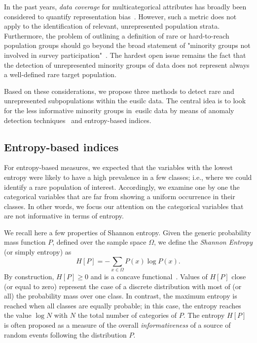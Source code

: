 In the past years, \emph{data coverage} for multicategorical attributes has broadly been considered to quantify representation bias~\cite[]{asudeh2019assessing, asudeh2021identifying, jin2020mithracoverage}.
However, such a metric does not apply to the identification of relevant, unrepresented population strata.
Furthermore, the problem of outlining a definition of rare or hard-to-reach population groups should go beyond the broad statement of "minority groups not involved in survey participation"~\cite[]{brackertz2007hard}. 
The hardest open issue remains the fact that the detection of unrepresented minority groups of data does not represent always a well-defined rare target population. 

Based on these considerations, we propose three methods to detect rare and unrepresented subpopulations within the \gls{eusilc} data.
The central idea is to look for the less informative minority groups in~\gls{eusilc} data by means of anomaly detection techniques~\cite[]{chandola2009anomaly} and entropy-based indices.

\subsection{Entropy-based indices}\label{sec: Entropy-Based indices}

For entropy-based measures, we expected that 
the variables with the lowest entropy were likely to have a high prevalence in a few classes; i.e., where we could identify a rare population of interest.
Accordingly, we examine one by one the categorical variables that are far from showing a uniform occurrence in their classes.
In other words, we focus our attention on the categorical variables that are not informative in terms of entropy. 

We recall here a few properties of Shannon entropy.
Given the generic probability mass function $P$, defined over the sample space $\Omega$, we define the \emph{Shannon Entropy} (or simply entropy) as 
\begin{equation}\label{eq: Entropy_discrete}
    H[P] = -\sum_{x\in \Omega} P(x) \log{P(x)}.
\end{equation}
By construction, $H[P] \ge 0$ and is a concave functional~\cite[]{bishop2006pattern}.  
Values of $H[P]$ close (or equal to zero) represent the case of a discrete distribution with most of (or all) the probability mass over one class.
In contrast, the maximum entropy is reached when all classes are equally probable; in this case, the entropy reaches the value $\log{N}$ with $N$ the total number of categories of $P$. 
The entropy $H[P]$ is often proposed as a measure of the overall \emph{informativeness} of a source of random events following the distribution $P$.

